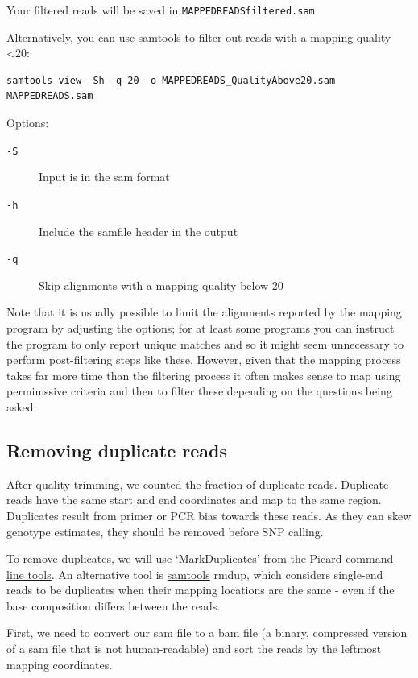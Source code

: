 \documentclass[11pt]{article}
\begin{document}
Your filtered reads will be saved in \texttt{MAPPEDREADSfiltered.sam}

Alternatively, you can 
use \href{http://samtools.sourceforge.net/samtools.shtml#mpileup}{samtools} to filter out reads with a mapping quality <20:


\begin{verbatim}
samtools view -Sh -q 20 -o MAPPEDREADS_QualityAbove20.sam MAPPEDREADS.sam
\end{verbatim}

Options:

\begin{description}
\item[\texttt{-S}] Input is in the sam format
\item[\texttt{-h}] Include the samfile header in the output
\item[\texttt{-q}] Skip alignments with a mapping quality below 20
\end{description}

Note that it is usually possible to limit the alignments reported by the
mapping program by adjusting the options; for at least some programs you can
instruct the program to only report unique matches and so it might seem
unnecessary to perform post-filtering steps like these. However, given that
the mapping process takes far more time than the filtering process it often
makes sense to map using permimssive criteria and then to filter these
depending on the questions being asked.
\subsection{Removing duplicate reads}
\label{sec-2-1}

After quality-trimming, we counted the fraction of duplicate
reads. Duplicate reads have the same start and end
coordinates and map to the same region. Duplicates result from primer
or PCR bias towards these reads. As they can skew genotype estimates,
they should be removed before SNP calling.

To remove duplicates, we will use `MarkDuplicates' from the \href{https://broadinstitute.github.io/picard/command-line-overview.html}{Picard command line tools}. An alternative tool is \href{http://samtools.sourceforge.net/samtools.shtml}{samtools} rmdup, which
considers single-end reads to be duplicates when their mapping
locations are the same - even if the base composition differs between
the reads.

First, we need to convert our sam file to a bam file (a binary,
compressed version of a sam file that is not human-readable) and sort
the reads by the leftmost mapping coordinates.
\end{document}
